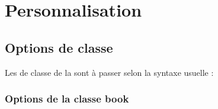 \chapter{Personnalisation}\label{cha-configuration}


\section{Options de classe}\label{options-classe}

Les  de classe de la \yatCl sont à passer selon la syntaxe
usuelle :


\subsection{Options de la classe \textsf{book}}\label{sec-options-usuelles-de}

